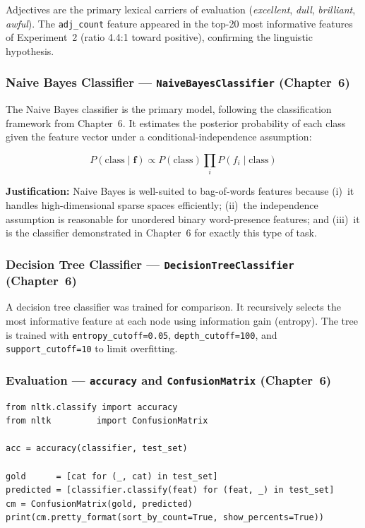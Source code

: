 \documentclass[11pt,a4paper]{article}
\begin{document}
Adjectives are the primary lexical carriers of evaluation (\emph{excellent},
\emph{dull}, \emph{brilliant}, \emph{awful}). The \texttt{adj\_count} feature appeared
in the top-20 most informative features of Experiment~2 (ratio 4.4:1 toward positive),
confirming the linguistic hypothesis.

\subsubsection{Naive Bayes Classifier --- \texttt{NaiveBayesClassifier} (Chapter~6)}

The Naive Bayes classifier is the primary model, following the classification framework
from Chapter~6. It estimates the posterior probability of each class given the feature
vector under a conditional-independence assumption:

\[
  P(\text{class} \mid \mathbf{f}) \propto P(\text{class})
  \prod_{i} P(f_i \mid \text{class})
\]

\textbf{Justification:} Naive Bayes is well-suited to bag-of-words features because
(i)~it handles high-dimensional sparse spaces efficiently; (ii)~the independence
assumption is reasonable for unordered binary word-presence features; and (iii)~it is
the classifier demonstrated in Chapter~6 for exactly this type of task.

\subsubsection{Decision Tree Classifier --- \texttt{DecisionTreeClassifier} (Chapter~6)}

A decision tree classifier was trained for comparison. It recursively selects the most
informative feature at each node using information gain (entropy). The tree is trained
with \texttt{entropy\_cutoff=0.05}, \texttt{depth\_cutoff=100}, and
\texttt{support\_cutoff=10} to limit overfitting.

\subsubsection{Evaluation --- \texttt{accuracy} and \texttt{ConfusionMatrix} (Chapter~6)}

\begin{lstlisting}[caption={Evaluation using NLTK's built-in tools.}]
from nltk.classify import accuracy
from nltk         import ConfusionMatrix

acc = accuracy(classifier, test_set)

gold      = [cat for (_, cat) in test_set]
predicted = [classifier.classify(feat) for (feat, _) in test_set]
cm = ConfusionMatrix(gold, predicted)
print(cm.pretty_format(sort_by_count=True, show_percents=True))
\end{lstlisting}
\end{document}

